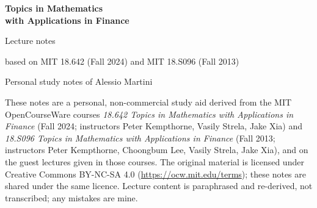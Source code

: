 \documentclass[11pt,oneside,openany]{book}
\begin{document}
\frontmatter
\begin{titlepage}
  \centering
  \vspace*{3cm}
  {\Huge\bfseries Topics in Mathematics\\[4pt] with Applications in Finance\par}
  \vspace{1cm}
  {\Large Lecture notes\par}
  \vspace{0.5cm}
  {\large based on MIT 18.642 (Fall 2024) and MIT 18.S096 (Fall 2013)\par}
  \vspace{2cm}
  {\large Personal study notes of Alessio Martini\par}
  \vfill
  \begin{minipage}{0.85\textwidth}\small
    These notes are a personal, non-commercial study aid derived from the MIT OpenCourseWare
    courses \emph{18.642 Topics in Mathematics with Applications in Finance} (Fall 2024;
    instructors Peter Kempthorne, Vasily Strela, Jake Xia) and \emph{18.S096 Topics in
    Mathematics with Applications in Finance} (Fall 2013; instructors Peter Kempthorne,
    Choongbum Lee, Vasily Strela, Jake Xia), and on the guest lectures given in those courses.
    The original material is licensed under Creative Commons BY-NC-SA 4.0
    (\url{https://ocw.mit.edu/terms}); these notes are shared under the same licence.
    Lecture content is paraphrased and re-derived, not transcribed; any mistakes are mine.
  \end{minipage}
  \vspace{1cm}
\end{titlepage}
\end{document}
